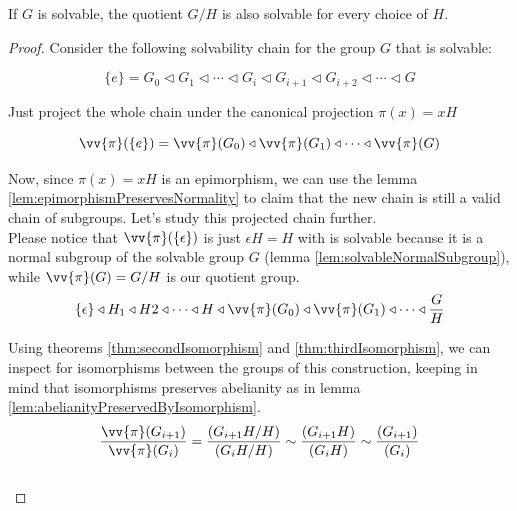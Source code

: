 \newpage

\begin{theorem}
    If $G$ is solvable, the quotient $G/H$ is also solvable for 
    every choice of $H$.
\end{theorem}
\begin{proof}
    Consider the following solvability chain for the group $G$ that is solvable:

    $$ \{e\} = G_0 \triangleleft G_1 \triangleleft \cdots 
    \triangleleft G_i \triangleleft G_{i+1} \triangleleft G_{i+2} \triangleleft 
    \cdots \triangleleft G $$
    \vspace{0.1em}

    Just project the whole chain under the canonical projection $\pi(x) = xH$

    $$ \vv{\pi}(\{e\}) = \vv{\pi}(G_0) \triangleleft \vv{\pi}(G_1) \triangleleft 
    \cdots \triangleleft \vv{\pi}(G) $$
    \vspace{0.1em}

    Now, since $\pi(x) = xH$ is an epimorphism, we can use the lemma 
    \ref{lem:epimorphismPreservesNormality} to claim that the new chain is still a valid 
    chain of subgroups. Let's study this projected chain further. \\
    
    Please notice that $\vv{\pi}(\{\epsilon\})$ is just $\epsilon H = H$ with is solvable 
    because it is a normal subgroup of the solvable group $G$ 
    (lemma \ref{lem:solvableNormalSubgroup}), while $\vv{\pi}(G) = G/H$ is our quotient group. \\
    
    $$ \{ \epsilon \}  \triangleleft H_1  \triangleleft H2  \triangleleft \dots  \triangleleft
    H \triangleleft \vv{\pi}(G_0) \triangleleft \vv{\pi}(G_1) \triangleleft 
    \cdots \triangleleft \frac{G}{H} $$
    \vspace{0.1em}

    Using theorems \ref{thm:secondIsomorphism} and \ref{thm:thirdIsomorphism}, 
    we can inspect for isomorphisms between 
    the groups of this construction, keeping in mind that isomorphisms preserves 
    abelianity as in lemma \ref{lem:abelianityPreservedByIsomorphism}. \\

    $$ \frac{\vv{\pi}(G_{i+1})}{\vv{\pi}(G_i)} 
    = \frac{(G_{i+1}H/H)}{(G_{i}H/H)} 
    \sim \frac{(G_{i+1}H)}{(G_{i}H)} 
    \sim \frac{(G_{i+1})}{(G_{i})} 
    $$ \\


\end{proof}
